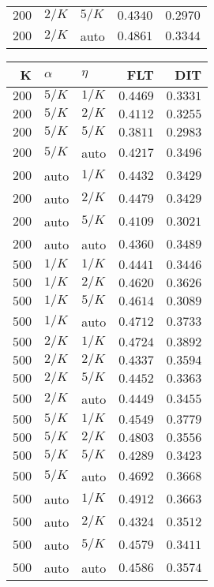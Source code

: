 \begin{table}
\begin{spacing}{1.2}
{\begin{tabular}{rll|rr}
$200$ &  $2/K$ &  $5/K$ &         $0.4340$ & $0.2970$ \\
$200$ &  $2/K$ &   auto &         $0.4861$ & $0.3344$ \\
\bottomrule
\end{tabular}
} \hfill \parbox{.45\linewidth}{\centering \begin{tabular}{rll|rr}
\toprule
    K &  $\alpha$ &    $\eta$ & FLT &        DIT \\
\midrule
$200$ &  $5/K$ &  $1/K$ &         $0.4469$ &      $0.3331$ \\
$200$ &  $5/K$ &  $2/K$ &         $0.4112$ &      $0.3255$ \\
$200$ &  $5/K$ &  $5/K$ &         $0.3811$ &      $0.2983$ \\
$200$ &  $5/K$ &   auto &         $0.4217$ &      $0.3496$ \\
$200$ &   auto &  $1/K$ &         $0.4432$ &      $0.3429$ \\
$200$ &   auto &  $2/K$ &         $0.4479$ &      $0.3429$ \\
$200$ &   auto &  $5/K$ &         $0.4109$ &      $0.3021$ \\
$200$ &   auto &   auto &         $0.4360$ &      $0.3489$ \\
$500$ &  $1/K$ &  $1/K$ &         $0.4441$ &      $0.3446$ \\
$500$ &  $1/K$ &  $2/K$ &         $0.4620$ &      $0.3626$ \\
$500$ &  $1/K$ &  $5/K$ &         $0.4614$ &      $0.3089$ \\
$500$ &  $1/K$ &   auto &         $0.4712$ &      $0.3733$ \\
$500$ &  $2/K$ &  $1/K$ &         $0.4724$ & $\bm{0.3892}$ \\
$500$ &  $2/K$ &  $2/K$ &         $0.4337$ &      $0.3594$ \\
$500$ &  $2/K$ &  $5/K$ &         $0.4452$ &      $0.3363$ \\
$500$ &  $2/K$ &   auto &         $0.4449$ &      $0.3455$ \\
$500$ &  $5/K$ &  $1/K$ &         $0.4549$ &      $0.3779$ \\
$500$ &  $5/K$ &  $2/K$ &         $0.4803$ &      $0.3556$ \\
$500$ &  $5/K$ &  $5/K$ &         $0.4289$ &      $0.3423$ \\
$500$ &  $5/K$ &   auto &         $0.4692$ &      $0.3668$ \\
$500$ &   auto &  $1/K$ &    $\bm{0.4912}$ &      $0.3663$ \\
$500$ &   auto &  $2/K$ &         $0.4324$ &      $0.3512$ \\
$500$ &   auto &  $5/K$ &         $0.4579$ &      $0.3411$ \\
$500$ &   auto &   auto &         $0.4586$ &      $0.3574$ \\
\bottomrule
\end{tabular}
}
\end{spacing}
\end{table}
